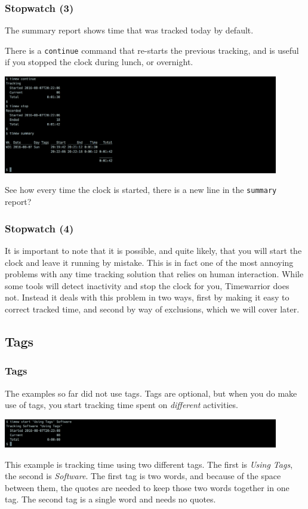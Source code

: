 \documentclass[t,handout]{beamer}
\begin{document}
\begin{frame}[fragile]\frametitle{Stopwatch (3)}
    The summary report shows time that was tracked today by default.

    There is a \verb=continue= command that re-starts the previous tracking, and is useful if you stopped the clock during lunch, or overnight.

    \includegraphics[width=12cm]{images/tutorial7.png}

    See how every time the clock is started, there is a new line in the \verb=summary= report?
\end{frame}

\begin{frame}[fragile]\frametitle{Stopwatch (4)}
    It is important to note that it is possible, and quite likely, that you will start the clock and leave it running by mistake. This is in fact one of the most annoying problems with any time tracking solution that relies on human interaction. While some tools will detect inactivity and stop the clock for you, Timewarrior does not. Instead it deals with this problem in two ways, first by making it easy to correct tracked time, and second by way of exclusions, which we will cover later.
\end{frame}

\subsection{Tags}

\begin{frame}[fragile]\frametitle{Tags}
    The examples so far did not use tags. Tags are optional, but when you do make use of tags, you start tracking time spent on \textit{different} activities.

    \includegraphics[width=12cm]{images/tutorial8.png}

    This example is tracking time using two different tags. The first is \textit{Using Tags}, the second is \textit{Software}. The first tag is two words, and because of the space between them, the quotes are needed to keep those two words together in one tag. The second tag is a single word and needs no quotes.
\end{frame}
\end{document}
